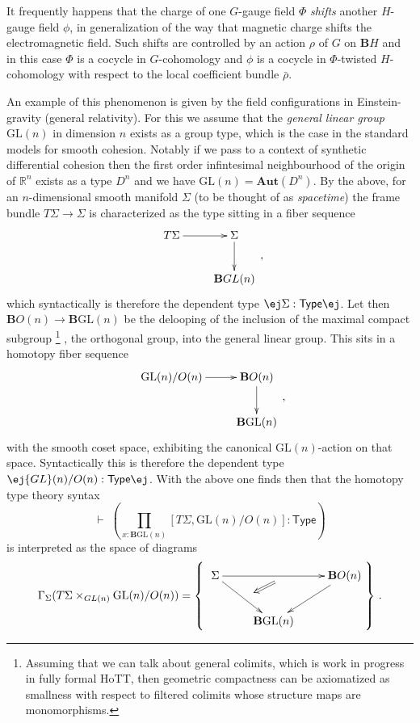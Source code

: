 \documentclass[copyright,12pt]{eptcs}
\makeatletter
\newcommand{\type}{\ensuremath{\mathsf{Type}}\xspace}
\def\jd#1{\@jd#1\ej}
\def\@jd#1|-#2\ej{\@@jd#1,,\;\vdash\;\left(#2\right)}
\def\@@jd#1,{\@ifmtarg{#1}{\let\next=\relax}{\left(#1\right)\let\next=\@@@jd}\next}
\def\@@@jd#1,{\@ifmtarg{#1}{\let\next=\relax}{,\,\left(#1\right)\let\next=\@@@jd}\next}
\makeatother
\begin{document}
It frequently happens that the charge of one $G$-gauge field $\Phi$ \emph{shifts} another $H$-gauge field
$\phi$, in generalization of the way that magnetic charge shifts the electromagnetic field.
Such shifts are controlled by an action $\rho$ of $G$ on $\mathbf{B}H$ and in this case
$\Phi$ is a cocycle in $G$-cohomology and $\phi$ is a cocycle in $\Phi$-twisted $H$-cohomology
with respect to the local coefficient bundle $\bar \rho$.

An example of this phenomenon is given by the field configurations in Einstein-gravity
(general relativity). For this we assume that the \emph{general linear group} $\mathrm{GL}(n)$
in dimension $n$ exists as a group type, which is the case in the standard models for
smooth cohesion. Notably if we pass to a context of synthetic differential cohesion then
the first order infintesimal neighbourhood of the origin of $\mathbb{R}^n$ exists as a
type $D^n$ and we have $\mathrm{GL}(n) = \mathbf{Aut}(D^n)$. By the above, for an $n$-dimensional
smooth manifold $\Sigma$ (to be thought of as \emph{spacetime}) the frame bundle
$T \Sigma \to \Sigma$
is characterized as the type sitting
in a fiber sequence
$$
  \raisebox{20pt}{
  \xymatrix{
    T \Sigma \ar[r] & \Sigma \ar[d]
  \\
  & \mathbf{B}GL(n)
  }}
  \,,
$$
which syntactically is therefore the dependent type $\jd{x : \mathbf{B}GL(n) |- T \Sigma : \type}$.
Let then $\mathbf{B}O(n) \to \mathbf{B}\mathrm{GL}(n)$ be the delooping of the inclusion of the
maximal compact subgroup
\footnote{Assuming that we can talk about general colimits, which is
work in progress in fully formal HoTT, then geometric compactness can be axiomatized
as smallness with respect to filtered colimits whose structure maps are monomorphisms.}
, the
orthogonal group, into the general linear group. This sits in a homotopy fiber sequence
$$
  \raisebox{20pt}{
  \xymatrix{
    \mathrm{GL}(n)/O(n) \ar[r] & \mathbf{B}O(n) \ar[d]
  \\
  & \mathbf{B}\mathrm{GL}(n)
  }
  }
  \,,
$$
with the smooth coset space, exhibiting the canonical $\mathrm{GL}(n)$-action on that space.
Syntactically this is therefore the dependent type
$\jd{x : \mathbf{B}\mathrm{GL}(n) |- \mathrm{GL}(n)/O(n) : \type}$.
With the above one finds then that the homotopy type theory syntax
$$
  \vdash\; \left(\prod_{x : \mathbf{B}\mathrm{GL}(n)} [T \Sigma, \mathrm{GL}(n)/O(n)] : \type\right)
$$
is interpreted as the space of diagrams
$$
  \Gamma_{\Sigma}(T \Sigma \times_{GL(n)} \mathrm{GL}(n)/O(n))
  =
  \left\{
   \raisebox{20pt}{
  \xymatrix{
    \Sigma \ar[rr]_{\ }="s" \ar[dr]^{\ }="t" && \mathbf{B}O(n) \ar[dl]
  \\
  & \mathbf{B}\mathrm{GL}(n)
  \ar@{=>} "s"; "t"
  }}
  \right\}
  \,.
$$
\end{document}
